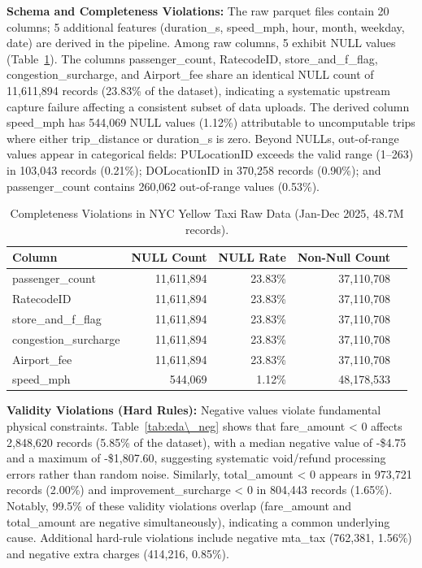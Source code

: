 \textbf{Schema and Completeness Violations:} The raw parquet files contain 20 columns; 5 additional features (duration\_s, speed\_mph, hour, month, weekday, date) are derived in the pipeline. Among raw columns, 5 exhibit NULL values (Table~\ref{tab:eda_null}). The columns passenger\_count, RatecodeID, store\_and\_f\_flag, congestion\_surcharge, and Airport\_fee share an identical NULL count of 11,611,894 records (23.83\% of the dataset), indicating a systematic upstream capture failure affecting a consistent subset of data uploads. The derived column speed\_mph has 544,069 NULL values (1.12\%) attributable to uncomputable trips where either trip\_distance or duration\_s is zero. Beyond NULLs, out-of-range values appear in categorical fields: PULocationID exceeds the valid range (1--263) in 103,043 records (0.21\%); DOLocationID in 370,258 records (0.90\%); and passenger\_count contains 260,062 out-of-range values (0.53\%).

\begin{table}[H]
\centering
\caption{Completeness Violations in NYC Yellow Taxi Raw Data (Jan-Dec 2025, 48.7M records).}
\label{tab:eda_null}
\begin{tabular}{lrrrr}
\toprule
\textbf{Column} & \textbf{NULL Count} & \textbf{NULL Rate} & \textbf{Non-Null Count} \\
\midrule
passenger\_count     & 11,611,894 & 23.83\% & 37,110,708 \\
RatecodeID           & 11,611,894 & 23.83\% & 37,110,708 \\
store\_and\_f\_flag  & 11,611,894 & 23.83\% & 37,110,708 \\
congestion\_surcharge & 11,611,894 & 23.83\% & 37,110,708 \\
Airport\_fee          & 11,611,894 & 23.83\% & 37,110,708 \\
speed\_mph           &    544,069 &  1.12\% & 48,178,533 \\
\bottomrule
\end{tabular}
\end{table}

\textbf{Validity Violations (Hard Rules):} Negative values violate fundamental physical constraints. Table~\ref{tab:eda\_neg} shows that fare\_amount < 0 affects 2,848,620 records (5.85\% of the dataset), with a median negative value of -\$4.75 and a maximum of -\$1,807.60, suggesting systematic void/refund processing errors rather than random noise. Similarly, total\_amount < 0 appears in 973,721 records (2.00\%) and improvement\_surcharge < 0 in 804,443 records (1.65\%). Notably, 99.5\% of these validity violations overlap (fare\_amount and total\_amount are negative simultaneously), indicating a common underlying cause. Additional hard-rule violations include negative mta\_tax (762,381, 1.56\%) and negative extra charges (414,216, 0.85\%).

